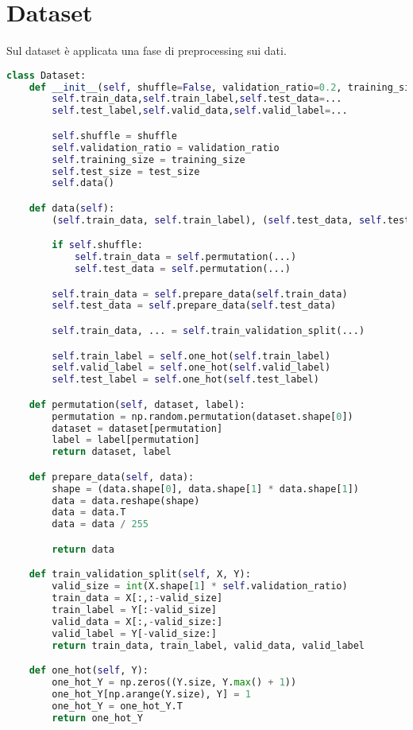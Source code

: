 \section{Dataset}
Sul dataset è applicata una fase di preprocessing sui dati.
\begin{lstlisting}[language=Python]
class Dataset:
    def __init__(self, shuffle=False, validation_ratio=0.2, training_size=10000, test_size=2500):
        self.train_data,self.train_label,self.test_data=...
        self.test_label,self.valid_data,self.valid_label=...

        self.shuffle = shuffle
        self.validation_ratio = validation_ratio
        self.training_size = training_size
        self.test_size = test_size
        self.data()

    def data(self):
        (self.train_data, self.train_label), (self.test_data, self.test_label) = mnist.load_data()

        if self.shuffle:
            self.train_data = self.permutation(...)
            self.test_data = self.permutation(...)

        self.train_data = self.prepare_data(self.train_data)
        self.test_data = self.prepare_data(self.test_data)

        self.train_data, ... = self.train_validation_split(...)

        self.train_label = self.one_hot(self.train_label)
        self.valid_label = self.one_hot(self.valid_label)
        self.test_label = self.one_hot(self.test_label)

    def permutation(self, dataset, label):
        permutation = np.random.permutation(dataset.shape[0])
        dataset = dataset[permutation]
        label = label[permutation]
        return dataset, label

    def prepare_data(self, data):
        shape = (data.shape[0], data.shape[1] * data.shape[1])
        data = data.reshape(shape)
        data = data.T
        data = data / 255

        return data

    def train_validation_split(self, X, Y):
        valid_size = int(X.shape[1] * self.validation_ratio)
        train_data = X[:,:-valid_size]
        train_label = Y[:-valid_size]
        valid_data = X[:,-valid_size:]
        valid_label = Y[-valid_size:]
        return train_data, train_label, valid_data, valid_label

    def one_hot(self, Y):
        one_hot_Y = np.zeros((Y.size, Y.max() + 1))
        one_hot_Y[np.arange(Y.size), Y] = 1
        one_hot_Y = one_hot_Y.T
        return one_hot_Y
\end{lstlisting}
